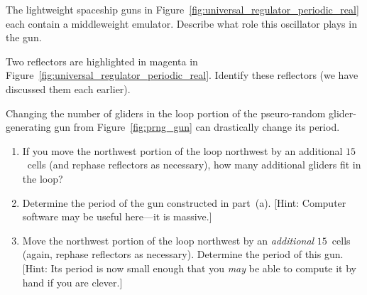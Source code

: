 \begin{multicols}{2}
\mfilbreak


\begin{problem}\label{exer:p60_regulator_mwss_emulator}
	The lightweight spaceship guns in Figure~\ref{fig:universal_regulator_periodic_real} each contain a middleweight emulator. Describe what role this oscillator plays in the gun.
\end{problem}


\mfilbreak


\begin{problem}\label{exer:p60_regulator_reflectors}
	Two reflectors are highlighted in magenta in Figure~\ref{fig:universal_regulator_periodic_real}. Identify these reflectors (we have discussed them each earlier).
\end{problem}


\mfilbreak


\begin{problem}\label{exer:prng_gun}
	Changing the number of gliders in the loop portion of the pseuro-random glider-generating gun from Figure~\ref{fig:prng_gun} can drastically change its period.\smallskip
	
	\begin{enumerate}[label=\bf\color{ocre}(\alph*)]
		\item If you move the northwest portion of the loop northwest by an additional $15$~cells (and rephase reflectors as necessary), how many additional gliders fit in the loop?
		
		\item Determine the period of the gun constructed in part~(a). [Hint: Computer software may be useful here---it is massive.]
		
		\item Move the northwest portion of the loop northwest by an \emph{additional} $15$~cells (again, rephase reflectors as necessary). Determine the period of this gun. [Hint: Its period is now small enough that you \emph{may} be able to compute it by hand if you are clever.]
	\end{enumerate}
\end{problem}






\end{multicols}

